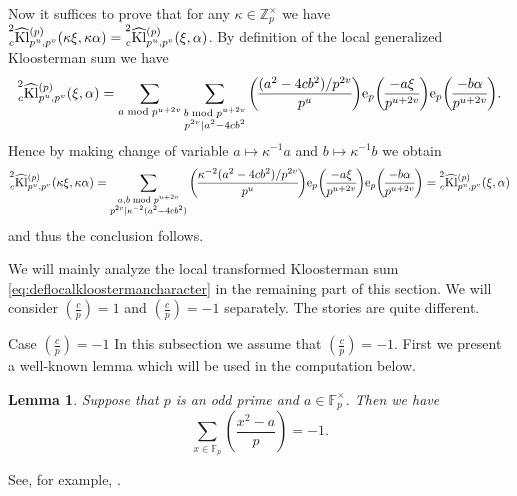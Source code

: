 \documentclass[10pt,oneside,reqno]{amsart}
\makeatletter
\newcommand\rme{\mathrm{e}}
\newcommand\FF{\mathbb{F}}
\newcommand\ZZ{\mathbb{Z}}
\newcommand\Kl{\mathrm{Kl}}
\newcommand\legendresymbol[2]{\genfrac{(}{)}{}{}{#1}{#2}}
\def\subsection{\@startsection{subsection}{2}%
  \z@{3pt\@plus0pt}{-.5em}%
  {\normalfont\bfseries}}
\theoremstyle{THEOREM}
\newtheorem{lemma}[theorem]{Lemma}
\theoremstyle{DEFINITION}
\theoremstyle{EXERCISE}
\numberwithin{equation}{section}
\renewenvironment{proof}[1][\proofname]{\par
  \vspace{-6pt}
  \pushQED{\qed}
  \normalfont \topsep6\p@\@plus6\p@\relax
  \trivlist
  \item[\hskip\labelsep\rmfamily\bfseries
    #1\@addpunct{:}]\ignorespaces
}{
  \popQED\endtrivlist\@endpefalse
  \vspace{-6pt}
}
\makeatother
\begin{document}
\begin{proof}
Now it suffices to prove that for any $\kappa\in \ZZ_p^\times$ we have $\prescript{2}{c}{\widehat{\Kl}}_{p^u,p^v}^{(p)}(\kappa\xi,\kappa\alpha)= \prescript{2}{c}{\widehat{\Kl}}_{p^u,p^v}^{(p)}(\xi,\alpha)$.
 By definition of the local generalized Kloosterman sum we have
\begin{equation}\label{eq:deflocalkloostermandoublecharacter}
\prescript{2}{c}{\widehat{\Kl}}_{p^u,p^v}^{(p)}(\xi,\alpha)=\sum_{a\bmod p^{u+2v}}\sum_{\substack{b\bmod p^{u+2v}\\ p^{2v}\mid a^2-4cb^2}}\legendresymbol{(a^2-4cb^2)/p^{2v}}{p^u}\rme_p\legendresymbol{-a\xi}{p^{u+2v}} \rme_p\legendresymbol{-b\alpha}{p^{u+2v}}.
\end{equation}
Hence by making change of variable $a\mapsto \kappa^{-1}a$ and $b\mapsto \kappa^{-1}b$ we obtain
\[
  \prescript{2}{c}{\widehat{\Kl}}_{p^u,p^v}^{(p)}(\kappa\xi,\kappa\alpha)=\sum_{\substack{a,b\bmod p^{u+2v}\\ p^{2v}\mid \kappa^{-2}(a^2-4cb^2)}}\legendresymbol{\kappa^{-2}(a^2-4cb^2)/p^{2v}}{p^u}\rme_p\legendresymbol{-a\xi}{p^{u+2v}} \rme_p\legendresymbol{-b\alpha}{p^{u+2v}}= \prescript{2}{c}{\widehat{\Kl}}_{p^u,p^v}^{(p)}(\xi,\alpha)
\]
and thus the conclusion follows.
\end{proof}

We will mainly analyze the local transformed Kloosterman sum \eqref{eq:deflocalkloostermancharacter} in the remaining part of this section.
We will consider $\legendresymbol{c}{p}=1$ and $\legendresymbol{c}{p}=-1$ separately. The stories are quite different.

\subsection{Case $\legendresymbol{c}{p}=-1$}
In this subsection we assume that $\legendresymbol{c}{p}=-1$. First we present a well-known lemma which will be used in the computation below.
\begin{lemma}
Suppose that $p$ is an odd prime and $a\in \FF_p^\times$. Then we have
\[
\sum_{x\in \FF_p}\legendresymbol{x^2-a}{p}=-1.
\]
\end{lemma}
\begin{proof}
See, for example, \cite[Lemma 2 of Appendix A]{langlands2004}.
\end{proof}
\end{document}
